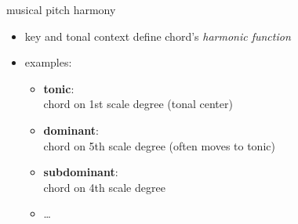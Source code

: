         \begin{frame}{musical pitch}{ harmony}
            \begin{itemize}
                \item	key and tonal context define chord's \textit{harmonic function}
                \smallskip
                \item   examples:
                \begin{itemize}
                    \item	\textbf{tonic}:\\ chord on 1st scale degree (tonal center)
                    \item	\textbf{dominant}:\\ chord on 5th scale degree (often moves to tonic)
                    \item	\textbf{subdominant}:\\ chord on 4th scale degree
                    \item	\ldots
                \end{itemize}
            \end{itemize}
        \end{frame}
